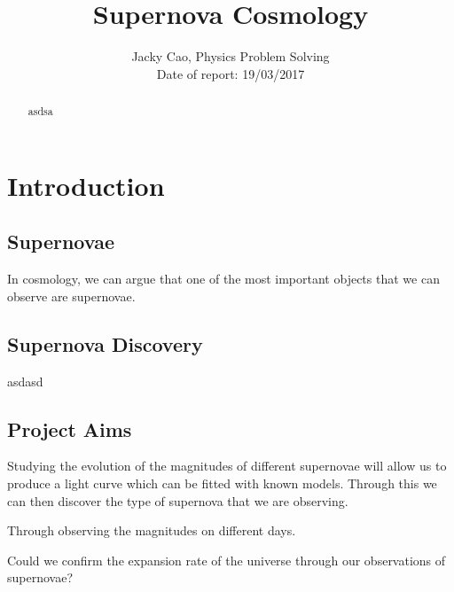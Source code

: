 \documentclass[twocolumn]{revtex4}
\begin{document}
\textheight=26.385cm

\title{Supernova Cosmology}
 
\author{Jacky Cao, Physics Problem Solving \\ Date of report: 19/03/2017}

\begin{abstract}              
asdsa
\end{abstract}

\maketitle

\vspace{-3ex}
\section{Introduction} 
\vspace{-2ex}
\subsection{Supernovae}
\vspace{-2ex}

In cosmology, we can argue that one of the most important objects that we can observe are supernovae.  

\vspace{-3ex}
\subsection{Supernova Discovery}
\vspace{-2ex}

asdasd

\vspace{-3ex}
\subsection{Project Aims}
\vspace{-2ex}

Studying the evolution of the magnitudes of different supernovae will allow us to produce a light curve which can be fitted with known models. Through this we can then discover the type of supernova that we are observing. 

Through observing the magnitudes on different days.

Could we confirm the expansion rate of the universe through our observations of supernovae? 
\end{document}
